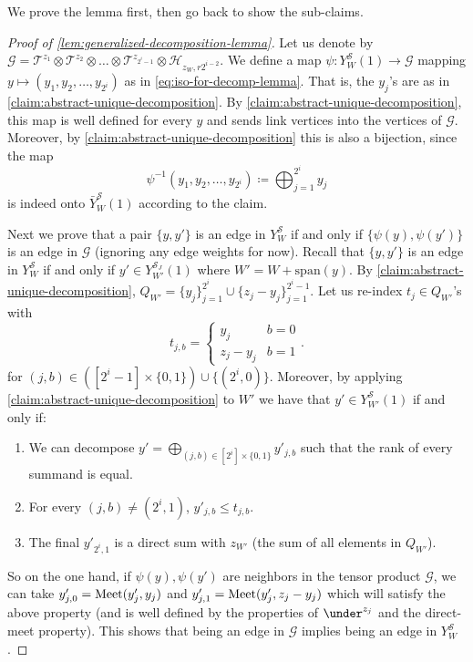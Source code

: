 \documentclass[10pt,a4paper]{article}
\newcommand{\prettyref}[1]{\cref{#1}}
\theoremstyle{definition}
\theoremstyle{remark}
\newcommand{\set}[1]{\{#1\}}
\def\sp{\mathrm{ span}}
\renewcommand{\leq}{\leqslant}
\numberwithin{equation}{section}
\let\pref=\prettyref
\def\Y{Y}
\def\Meet{\textup{Meet}}
\begin{document}
We prove the lemma first, then go back to show the sub-claims.
\begin{proof}[Proof of \pref{lem:generalized-decomposition-lemma}]
    Let us denote by \(\mathcal{G} = \mathcal{T}^{z_1} \otimes \mathcal{T}^{z_2} \otimes \dots \otimes \mathcal{T}^{z_{2^i-1}} \otimes \mathcal{H}_{z_W,r2^{i-2}}\). We define a map \(\psi: Y^{\mathcal{S}}_W(1) \to \mathcal{G}\) mapping \(y \mapsto (y_1,y_2,\dots,y_{2^i})\) as in \eqref{eq:iso-for-decomp-lemma}. That is, the \(y_j\)'s are as in \pref{claim:abstract-unique-decomposition}. By \pref{claim:abstract-unique-decomposition}, this map is well defined for every \(y\) and sends link vertices into the vertices of \(\mathcal{G}\). Moreover, by \pref{claim:abstract-unique-decomposition} this is also a bijection, since the map \[\psi^{-1}(y_1,y_2,\dots,y_{2^i}) \coloneqq \bigoplus_{j=1}^{2^i} y_j\]
    is indeed onto \(\bar{Y}^{\mathcal{S}}_{W}(1)\) according to the claim.

    Next we prove that a pair \(\set{y,y'}\) is an edge in \(\Y^{\mathcal{S}}_W\) if and only if \(\set{\psi(y),\psi(y')}\) is an edge in \(\mathcal{G}\) (ignoring any edge weights for now). Recall that \(\set{y,y'}\) is an edge in \(\Y^{\mathcal{S}}_W\) if and only if \(y' \in Y^{\mathcal{S}_J}_{W'}(1)\) where \(W'=W+\sp(y)\).
    By \pref{claim:abstract-unique-decomposition}, \(Q_{W'} = \set{y_j}_{j=1}^{2^i} \cup \set{z_j - y_j}_{j=1}^{2^i-1}\). 
    Let us re-index \(t_j \in Q_{W'}\)'s with \[t_{j,b} = \begin{cases}
            y_j & b=0 \\ z_j - y_j & b=1
    \end{cases}.\]
    for \((j,b) \in \left ( [2^i - 1] \times \set{0,1} \right ) \cup \set{(2^i,0)}\). 
    Moreover, by applying \pref{claim:abstract-unique-decomposition} to \(W'\) we have that \(y' \in \Y^{\mathcal{S}}_{W'}(1)\) if and only if:
    \begin{enumerate}
        \item We can decompose \(y'=\bigoplus_{(j,b)\in [2^i] \times \set{0,1} }y'_{j,b}\) such that the rank of every summand is equal. 
        \item For every \((j,b) \ne (2^i,1)\), \(y'_{j,b} \leq t_{j,b}\).
        \item The final \(y'_{2^i,1}\) is a direct sum with \(z_{W'}\) (the sum of all elements in \(Q_{W'}\)).
    \end{enumerate}

    So on the one hand, if \(\psi(y),\psi(y')\) are neighbors in the tensor product \(\mathcal{G}\), we can take \(y_{j,0}' = \Meet(y_j',y_j)\) and \(y_{j,1}' = \Meet(y_j',z_j - y_j)\) which will satisfy the above property (and is well defined by the properties of \(\under^{z_j}\) and the direct-meet property). This shows that being an edge in \(\mathcal{G}\) implies being an edge in \(\Y^{\mathcal{S}}_W\). 
    

\end{proof}
\end{document}
